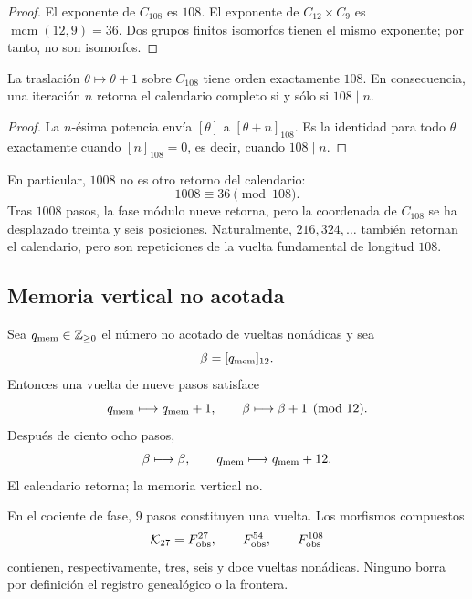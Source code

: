 \begin{proof}
El exponente de \(C_{108}\) es \(108\). El exponente de
\(C_{12}\times C_9\) es
\(\operatorname{mcm}(12,9)=36\). Dos grupos finitos isomorfos tienen el
mismo exponente; por tanto, no son isomorfos.
\end{proof}

\begin{theorem}
\label{p12-83-c1-s13:thm:tpk-periodo-exacto-108}
La traslación \(\theta\mapsto\theta+1\) sobre \(C_{108}\) tiene orden
exactamente \(108\). En consecuencia, una iteración \(n\) retorna el
calendario completo si y sólo si \(108\mid n\).
\end{theorem}

\begin{proof}
La \(n\)-ésima potencia envía \([\theta]\) a \([\theta+n]_{108}\). Es
la identidad para todo \(\theta\) exactamente cuando \([n]_{108}=0\), es
decir, cuando \(108\mid n\).
\end{proof}

En particular, \(1008\) no es otro retorno del calendario:
\[
 1008\equiv36\pmod{108}.
\]
Tras \(1008\) pasos, la fase módulo nueve retorna, pero la coordenada de
\(C_{108}\) se ha desplazado treinta y seis posiciones. Naturalmente,
\(216,324,\ldots\) también retornan el calendario, pero son repeticiones de
la vuelta fundamental de longitud \(108\).

\subsection{Memoria vertical no acotada}

Sea \(q_{\rm mem}\in\mathbb Z_{\geq0}\) el número no acotado de vueltas
nonádicas y sea
\[
 \beta=[q_{\rm mem}]_{12}.
\]
Entonces una vuelta de nueve pasos satisface
\[
 q_{\rm mem}\longmapsto q_{\rm mem}+1,
 \qquad
 \beta\longmapsto\beta+1\pmod{12}.
\]
Después de ciento ocho pasos,
\[
 \beta\longmapsto\beta,
 \qquad
 q_{\rm mem}\longmapsto q_{\rm mem}+12.
\]
El calendario retorna; la memoria vertical no.

\begin{corollary}
\label{p12-83-c1-s13:cor:tpk-jerarquia-retornos}
En el cociente de fase,
\(9\) pasos constituyen una vuelta. Los morfismos compuestos
\[
 \mathcal K_{27}=F_{\rm obs}^{27},
 \qquad
 F_{\rm obs}^{54},
 \qquad
 F_{\rm obs}^{108}
\]
contienen, respectivamente, tres, seis y doce vueltas nonádicas. Ninguno
borra por definición el registro genealógico o la frontera.
\end{corollary}

